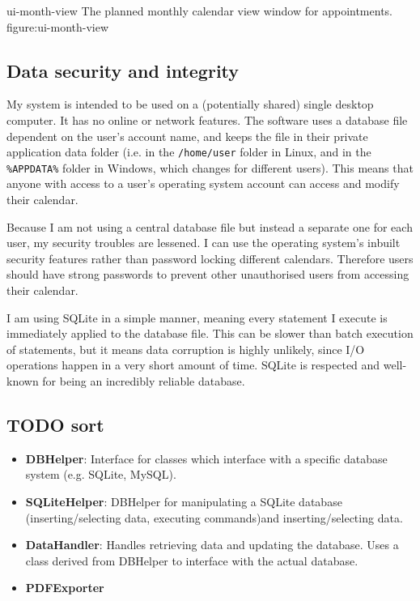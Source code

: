\addfigure
    {ui-month-view}
    {The planned monthly calendar view window for appointments.}
    {figure:ui-month-view}


\subsection{Data security and integrity}

My system is intended to be used on a (potentially shared) single desktop
computer. It has no online or network features. The software uses a database
file dependent on the user's account name, and keeps the file in their private
application data folder (i.e. in the \texttt{/home/user} folder in Linux, and in
the \verb|%APPDATA%| folder in Windows, which changes for different users). This
means that anyone with access to a user's operating system account can access
and modify their calendar.

Because I am not using a central database file but instead a separate one for
each user, my security troubles are lessened. I can use the operating system's
inbuilt security features rather than password locking different calendars.
Therefore users should have strong passwords to prevent other unauthorised users
from accessing their calendar.

I am using SQLite in a simple manner, meaning every statement I execute is
immediately applied to the database file. This can be slower than batch
execution of statements, but it means data corruption is highly unlikely, since
I/O operations happen in a very short amount of time. SQLite is respected and
well-known for being an incredibly reliable database.







\subsection{TODO sort}

\newcommand{\classitem}[1]{\item \textbf{#1}}

\begin{itemize}
    \classitem{DBHelper}: Interface for classes which interface with a specific
    database system (e.g. SQLite, MySQL).
    \classitem{SQLiteHelper}: DBHelper for manipulating a SQLite database
    (inserting/selecting data, executing commands)and inserting/selecting data.
    \classitem{DataHandler}: Handles retrieving data and updating the database.
    Uses a class derived from DBHelper to interface with the actual database.
    \classitem{PDFExporter}
\end{itemize}

